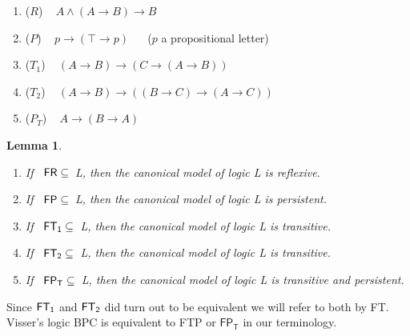 \documentclass[12pt]{article}
\newtheorem{thm}{Theorem}[section]
\newtheorem{lem}[thm]{Lemma}
\begin{document}
\begin{enumerate}
\item[] ($ R$) ~ $A\wedge (A\rightarrow B)\rightarrow B $
\item[] ($P$) ~ $p \rightarrow (\top \rightarrow p) $  ~~ ($ p $ a propositional letter)
\item[] ($ T_{1}$)  ~ $(A\rightarrow B)\rightarrow (C \rightarrow (A\rightarrow B))$
\item[] ($ T_{2}$)  ~ $(A\rightarrow B)\rightarrow ((B\rightarrow C)\rightarrow (A\rightarrow C))$
\item[] ($P_{T}$) ~ $A \rightarrow (B \rightarrow A) $
\end{enumerate}
\begin{lem} \label{FTPR}\quad
\label{mmm}
\begin{enumerate}
\item[(a)] If~ ${\sf FR}\subseteq$~\textit{L}, then the canonical model of logic \textit{L} is reflexive.
\item[(b)] If~ ${\sf FP}\subseteq$~\textit{L}, then the canonical model of logic \textit{L} is persistent.
\item[(c)] If~ ${\sf FT_{1}}\subseteq$~\textit{L}, then the canonical model of logic \textit{L} is transitive.
\item[(c)] If~ ${\sf FT_{2}}\subseteq$~\textit{L}, then the canonical model of logic \textit{L} is transitive.
\item[(d)] If~ ${\sf FP_{T}}\subseteq$~\textit{L}, then the canonical model of logic \textit{L} is transitive and persistent.
\end{enumerate}
\end{lem}

Since ${\sf FT_{1}}$ and ${\sf FT_{2}}$ did turn out to be equivalent we will refer to both by {\sf FT}.
Visser's logic {\sf BPC} is equivalent to {\sf FTP} or $\mathsf{ FP_T}$  in our terminology.
\end{document}
